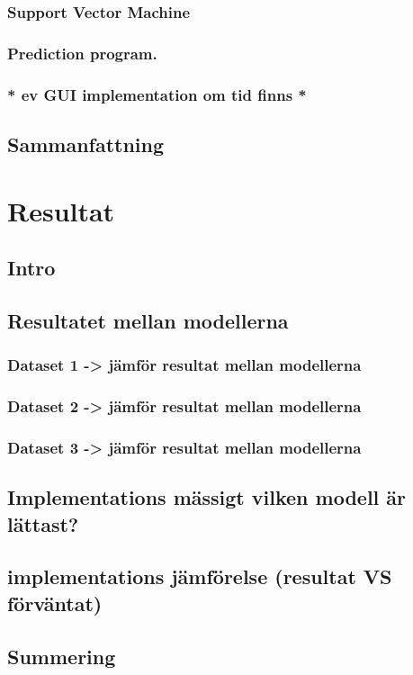 \documentclass{kaumasters} %
\begin{document}
\subsection{Support Vector Machine}\label{impl:svm}
\subsection{Prediction program.}
\subsection{* ev GUI implementation om tid finns *}
\section{Sammanfattning}

\chapter{Resultat} \label{res}
\section{Intro}
\section{Resultatet mellan modellerna}
\subsection{Dataset 1 -> jämför resultat mellan modellerna}
\subsection{Dataset 2 -> jämför resultat mellan modellerna}
\subsection{Dataset 3 -> jämför resultat mellan modellerna}
\newpage
\section{Implementations mässigt vilken modell är lättast?}
\section{implementations jämförelse (resultat VS förväntat)}
\section{Summering}
\end{document}
